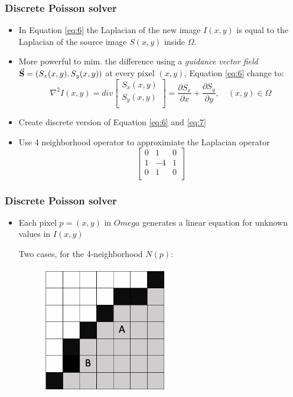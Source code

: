 \documentclass{beamer}
\begin{document}
\begin{frame}
    \frametitle{Discrete Poisson solver}
    \begin{itemize}
        \item In Equation \ref{eq:6} the Laplacian of the new image $I(x,y)$ is equal to the Laplacian of the source image $S(x,y)$ inside $\Omega$. 
        \item More powerful to mim. the difference using a {\it guidance vector field} $\vec{{\bf S}}=(S_x(x,y), S_y(x,y))$ at every pixel $(x,y)$, Equation \ref{eq:6} change to:        
        \begin{equation}
            \label{eq:8}
            \nabla^2 I(x,y) = div
            \begin{bmatrix}
                S_x(x,y) \\[0.3em]
                S_y(x,y) \\[0.3em]                
            \end{bmatrix}
            = \frac{\partial S_x}{\partial x}+\frac{\partial S_y}{\partial y}, \quad (x,y) \in \Omega
        \end{equation} 
        \item Create discrete version of Equation \ref{eq:6} and \ref{eq:7} 
        \item Use 4 neighborhood operator to approximiate the Laplacian operator 
        \[
        \begin{bmatrix}
            0 & 1 & 0       \\[0.3em]
            1 & -4 & 1      \\[0.3em]
            0 & 1 & 0       \\[0.3em]
          \end{bmatrix}
        \]
    \end{itemize}        
\end{frame} 

\begin{frame}
    \frametitle{Discrete Poisson solver}
    \begin{itemize}    
        \item Each pixel $p=(x,y)$ in $Omega$ generates a linear equation for unknown values in $I(x,y)$    
        \begin{item} 
            Two cases, for the 4-neighborhood $N(p)$: 
            \begin{figure}[!ht]
                \centering
                \includegraphics[width=2.2in]{resource/grid.png}            
            \end{figure}            
        \end{item}
    \end{itemize}
\end{frame} 
\end{document}
